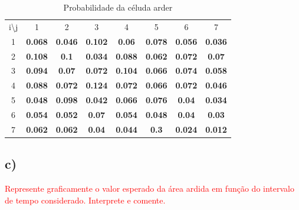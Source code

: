 \documentclass[11pt]{article} %
\begin{document}
\begin{table}[h]
\centering
\begin{tabular}{cccccccc}
i\textbackslash{}j     & 1                                   & 2                                   & 3                                   & 4                                   & 5                                   & 6                                   & 7                                   \\ \cline{2-8}
\multicolumn{1}{c|}{1} & \multicolumn{1}{c|}{\textbf{0.068}} & \multicolumn{1}{c|}{\textbf{0.046}} & \multicolumn{1}{c|}{\textbf{0.102}} & \multicolumn{1}{c|}{\textbf{0.06}}  & \multicolumn{1}{c|}{\textbf{0.078}} & \multicolumn{1}{c|}{\textbf{0.056}} & \multicolumn{1}{c|}{\textbf{0.036}} \\ \cline{2-8}
\multicolumn{1}{c|}{2} & \multicolumn{1}{c|}{\textbf{0.108}} & \multicolumn{1}{c|}{\textbf{0.1}}   & \multicolumn{1}{c|}{\textbf{0.034}} & \multicolumn{1}{c|}{\textbf{0.088}} & \multicolumn{1}{c|}{\textbf{0.062}} & \multicolumn{1}{c|}{\textbf{0.072}} & \multicolumn{1}{c|}{\textbf{0.07}}  \\ \cline{2-8}
\multicolumn{1}{c|}{3} & \multicolumn{1}{c|}{\textbf{0.094}} & \multicolumn{1}{c|}{\textbf{0.07}}  & \multicolumn{1}{c|}{\textbf{0.072}} & \multicolumn{1}{c|}{\textbf{0.104}} & \multicolumn{1}{c|}{\textbf{0.066}} & \multicolumn{1}{c|}{\textbf{0.074}} & \multicolumn{1}{c|}{\textbf{0.058}} \\ \cline{2-8}
\multicolumn{1}{c|}{4} & \multicolumn{1}{c|}{\textbf{0.088}} & \multicolumn{1}{c|}{\textbf{0.072}} & \multicolumn{1}{c|}{\textbf{0.124}} & \multicolumn{1}{c|}{\textbf{0.072}} & \multicolumn{1}{c|}{\textbf{0.066}} & \multicolumn{1}{c|}{\textbf{0.072}} & \multicolumn{1}{c|}{\textbf{0.046}} \\ \cline{2-8}
\multicolumn{1}{c|}{5} & \multicolumn{1}{c|}{\textbf{0.048}} & \multicolumn{1}{c|}{\textbf{0.098}} & \multicolumn{1}{c|}{\textbf{0.042}} & \multicolumn{1}{c|}{\textbf{0.066}} & \multicolumn{1}{c|}{\textbf{0.076}} & \multicolumn{1}{c|}{\textbf{0.04}}  & \multicolumn{1}{c|}{\textbf{0.034}} \\ \cline{2-8}
\multicolumn{1}{c|}{6} & \multicolumn{1}{c|}{\textbf{0.054}} & \multicolumn{1}{c|}{\textbf{0.052}} & \multicolumn{1}{c|}{\textbf{0.07}}  & \multicolumn{1}{c|}{\textbf{0.054}} & \multicolumn{1}{c|}{\textbf{0.048}} & \multicolumn{1}{c|}{\textbf{0.04}}  & \multicolumn{1}{c|}{\textbf{0.03}}  \\ \cline{2-8}
\multicolumn{1}{c|}{7} & \multicolumn{1}{c|}{\textbf{0.062}} & \multicolumn{1}{c|}{\textbf{0.062}} & \multicolumn{1}{c|}{\textbf{0.04}}  & \multicolumn{1}{c|}{\textbf{0.044}} & \multicolumn{1}{c|}{\textbf{0.3}}   & \multicolumn{1}{c|}{\textbf{0.024}} & \multicolumn{1}{c|}{\textbf{0.012}} \\ \cline{2-8}
\end{tabular}
\caption{Probabilidade da céluda arder}
\end{table}

\subsection*{c)}
\textcolor{red}{Represente graficamente o valor esperado da área ardida em função do intervalo
de tempo considerado. Interprete e comente.}
\end{document}
